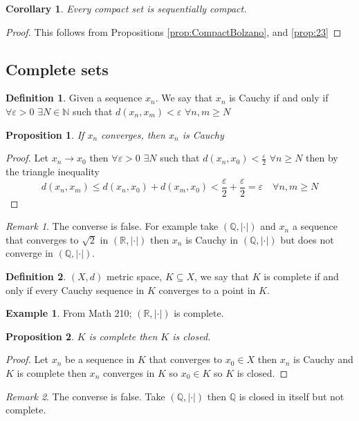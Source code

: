\documentclass[11pt,openany]{book}
\theoremstyle{plain}
\newtheorem{corollary}{Corollary}[chapter]
\newtheorem{proposition}{Proposition}[chapter]
\theoremstyle{definition}
\newtheorem{definition}{Definition}[chapter]
\newtheorem{example}{Example}[chapter]
\theoremstyle{remark}
\newtheorem{remark}{Remark}[chapter]
\newcommand{\R}{\mathbb{R}}
\newcommand{\N}{\mathbb{N}}
\newcommand{\Q}{\mathbb{Q}}
\newcommand{\eps}{\varepsilon}
\begin{document}
\begin{corollary}
Every compact set is sequentially compact.
\end{corollary}

\begin{proof}
    This follows from Propositions \ref{prop:CompactBolzano}, and \ref{prop:23}
\end{proof}

\subsection{Complete sets}
\begin{definition}
    Given a sequence $x_n$. We say that $x_n$ is Cauchy if and only if $\forall \eps>0$ $\exists N \in \N$ such that $d(x_n, x_m) < \eps$ $\forall n,m \ge N$
\end{definition}

\begin{proposition}
    If $x_n$ converges, then $x_n$ is Cauchy
\end{proposition}
\begin{proof}
    Let $x_n \to x_0$ then $\forall \eps >0$ $\exists N$ such that $d(x_n, x_0) < \frac{\eps}{2}$ $\forall n \ge N$ then by the triangle inequality \[ d(x_n, x_m) \le d(x_n, x_0) + d(x_m, x_0) < \frac{\eps}{2} + \frac{\eps}{2} = \eps \quad \forall n,m \ge N\]
\end{proof}




\begin{remark}
    The converse is false. For example take $(\Q, |\cdot|)$ and $x_n$ a sequence that converges to $\sqrt{2}$ in $(\R, |\cdot|)$ then $x_n$ is Cauchy in $(\Q, |\cdot|)$ but does not converge in $(\Q, |\cdot|)$.
\end{remark}

\begin{definition}
    $(X,d)$ metric space, $K \subseteq X$, we say that $K$ is complete if and only if every Cauchy sequence in $K$ converges to a point in $K$.
\end{definition}

\begin{example}
    From Math 210; $(\R, |\cdot|)$ is complete.
\end{example}

\begin{proposition}
    $K$ is complete then $K$ is closed.
\end{proposition}
\begin{proof}
    Let $x_n$ be a sequence in $K$ that converges to $x_0 \in X$ then $x_n$ is Cauchy and $K$ is complete then $x_n$ converges in $K$ so $x_0 \in K$ so $K$ is closed.
\end{proof}
\begin{remark}
    The converse is false. Take $(\Q, |\cdot|)$ then $\Q$ is closed in itself but not complete.
\end{remark}
\end{document}
